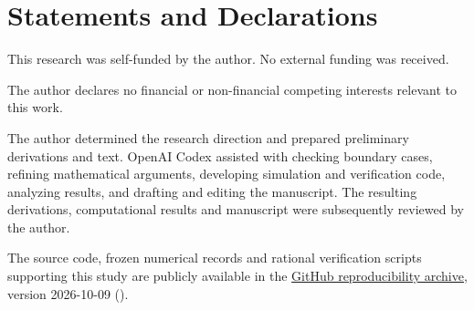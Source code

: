 \documentclass[pdflatex,sn-mathphys-num]{sn-jnl}
\theoremstyle{thmstyleone}
\theoremstyle{thmstyletwo}\newtheorem{remark}[theorem]{Remark}
\begin{document}
\section*{Statements and Declarations}
This research was self-funded by the author. No external funding was received.

The author declares no financial or non-financial competing interests
relevant to this work.

The author determined the research direction and prepared preliminary
derivations and text. OpenAI Codex assisted with checking boundary cases,
refining mathematical arguments, developing simulation and verification
code, analyzing results, and drafting and editing the manuscript. The
resulting derivations, computational results and manuscript were
subsequently reviewed by the author.

The source code, frozen numerical records and rational verification scripts
supporting this study are publicly available in the
\href{https://github.com/moyuye77-code/Minimum-Peak-Control-of-Fifth-Order-Integrators-via-Exact-Semidefinite-Lifts/releases/tag/reproducibility-2026-10-09}{GitHub reproducibility archive},
version 2026-10-09 ().
\end{document}
